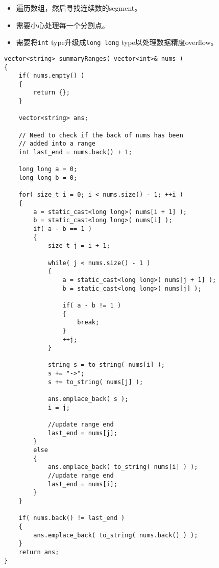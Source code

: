 \begin{itemize}
\item 遍历数组，然后寻找连续数的segment。
\item 需要小心处理每一个分割点。
\item 需要将\texttt{int} type升级成\texttt{long long} type以处理数据精度overflow。
\end{itemize}
\setcounter{lstlisting}{0}
\begin{lstlisting}[style=customc, caption={Plain Algorithm}]
vector<string> summaryRanges( vector<int>& nums )
{
    if( nums.empty() )
    {
        return {};
    }

    vector<string> ans;

    // Need to check if the back of nums has been
    // added into a range
    int last_end = nums.back() + 1;

    long long a = 0;
    long long b = 0;

    for( size_t i = 0; i < nums.size() - 1; ++i )
    {
        a = static_cast<long long>( nums[i + 1] );
        b = static_cast<long long>( nums[i] );
        if( a - b == 1 )
        {
            size_t j = i + 1;

            while( j < nums.size() - 1 )
            {
                a = static_cast<long long>( nums[j + 1] );
                b = static_cast<long long>( nums[j] );

                if( a - b != 1 )
                {
                    break;
                }
                ++j;
            }

            string s = to_string( nums[i] );
            s += "->";
            s += to_string( nums[j] );

            ans.emplace_back( s );
            i = j;

            //update range end
            last_end = nums[j];
        }
        else
        {
            ans.emplace_back( to_string( nums[i] ) );
            //update range end
            last_end = nums[i];
        }
    }

    if( nums.back() != last_end )
    {
        ans.emplace_back( to_string( nums.back() ) );
    }
    return ans;
}
\end{lstlisting}